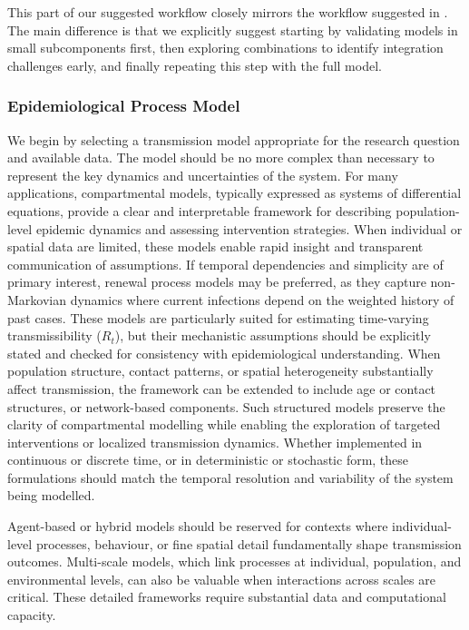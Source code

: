 \documentclass{article}
\begin{document}
This part of our suggested workflow closely mirrors the workflow suggested in \citet{gelman2020bayesian}.
The main difference is that we explicitly suggest starting by validating models in small subcomponents first, then exploring combinations to identify integration challenges early, and finally repeating this step with the full model.

\subsubsection{Epidemiological Process Model}
We begin by selecting a transmission model appropriate for the research question and available data. The model should be no more complex than necessary to represent the key dynamics and uncertainties of the system. For many applications, compartmental models, typically expressed as systems of differential equations, provide a clear and interpretable framework for describing population-level epidemic dynamics and assessing intervention strategies. When individual or spatial data are limited, these models enable rapid insight and transparent communication of assumptions. If temporal dependencies and simplicity are of primary interest, renewal process models may be preferred, as they capture non-Markovian dynamics where current infections depend on the weighted history of past cases. These models are particularly suited for estimating time-varying transmissibility ($R_t$), but their mechanistic assumptions should be explicitly stated and checked for consistency with epidemiological understanding.  When population structure, contact patterns, or spatial heterogeneity substantially affect transmission, the framework can be extended to include age or contact structures, or network-based components. Such structured models preserve the clarity of compartmental modelling while enabling the exploration of targeted interventions or localized transmission dynamics. 
Whether implemented in continuous or discrete time, or in deterministic or stochastic form, these formulations should match the temporal resolution and variability of the system being modelled. 

Agent-based or hybrid models should be reserved for contexts where individual-level processes, behaviour, or fine spatial detail fundamentally shape transmission outcomes. Multi-scale models, which link processes at individual, population, and environmental levels, can also be valuable when interactions across scales are critical. These detailed frameworks require substantial data and computational capacity.
\end{document}
